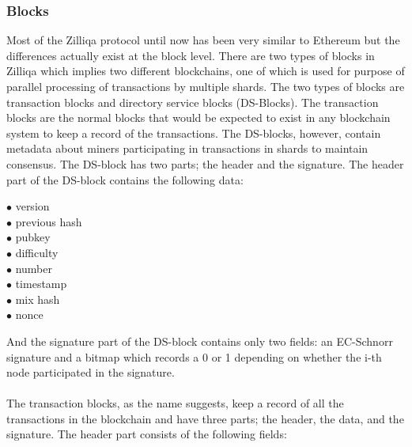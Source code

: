 \documentclass[a4paper,twoside,phd]{BYUPhys}
\begin{document}
\subsubsection{Blocks}
Most of the Zilliqa protocol until now has been very similar to Ethereum but the differences actually exist at the block level. There are two types of blocks in Zilliqa which implies two different blockchains, one of which is used for purpose of parallel processing of transactions by multiple shards\cite{TheZilliqaTeam2017TheWhitepaper}. The two types of blocks are transaction blocks and directory service blocks (DS-Blocks)\cite{TheZilliqaTeam2017TheWhitepaper}. The transaction blocks are the normal blocks that would be expected to exist in any blockchain system to keep a record of the transactions. The DS-blocks, however, contain metadata about miners participating in transactions in shards to maintain consensus\cite{TheZilliqaTeam2017TheWhitepaper}. The DS-block has two parts; the header and the signature. The header part of the DS-block contains the following data\cite{TheZilliqaTeam2017TheWhitepaper}:
\begin{description}
\item[$\bullet$ version]
\item[$\bullet$ previous hash]
\item[$\bullet$ pubkey]
\item[$\bullet$ difficulty]
\item[$\bullet$ number]
\item[$\bullet$ timestamp]
\item[$\bullet$ mix hash]
\item[$\bullet$ nonce]
\end{description}
And the signature part of the DS-block contains only two fields: an EC-Schnorr signature and a bitmap which records a 0 or 1 depending on whether the i-th node participated in the signature\cite{TheZilliqaTeam2017TheWhitepaper}.
\\
\\
The transaction blocks, as the name suggests,  keep a record of all the transactions in the blockchain and have three parts; the header, the data, and the signature\cite{TheZilliqaTeam2017TheWhitepaper}. The header part consists of the following fields\cite{TheZilliqaTeam2017TheWhitepaper}:
\end{document}
